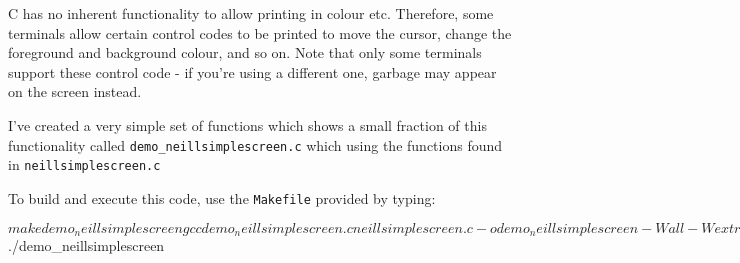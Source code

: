 C has no inherent functionality to allow printing in colour etc.
Therefore, some terminals allow certain control codes to be printed
to move the cursor, change the foreground and background colour, and
so on.
Note that only some terminals support these control code - if you're
using a different one, garbage may appear on the screen instead.

I've created a very simple set of functions which shows a small
fraction of this functionality called \verb^demo_neillsimplescreen.c^
which using the functions found in \verb^neillsimplescreen.c^

To build and execute this code, use the \verb^Makefile^ provided by typing:
\begin{terminaloutput}
$ make demo_neillsimplescreen
gcc demo_neillsimplescreen.c neillsimplescreen.c
-o demo_neillsimplescreen -Wall -Wextra -pedantic 
-std=c90 -g3 -fsanitize=undefined -fsanitize=address -lm
$ ./demo_neillsimplescreen 
\end{terminaloutput}

